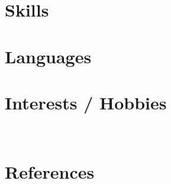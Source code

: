 \documentclass[a4paper,11pt]{article}
\begin{document}
% 
% 
% 
% 

\section{Skills}


\section{Languages}


\section{Interests / Hobbies}
 \\[-20pt]

\section{References}

\end{document}
